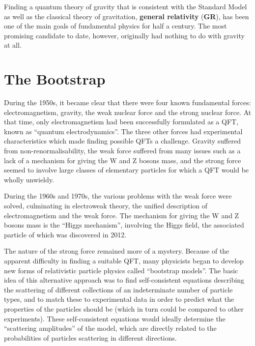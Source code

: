 \documentclass[12pt]{article}
\begin{document}
Finding a quantum theory of gravity that is consistent with the Standard Model as well as the classical theory of gravitation, \textbf{general relativity} (\textbf{GR}), has been one of the main goals of fundamental physics for half a century. The most promising candidate to date, however, originally had nothing to do with gravity at all.

\section{The Bootstrap}

During the 1950s, it became clear that there were four known fundamental forces: electromagnetism, gravity, the weak nuclear force and the strong nuclear force. At that time, only electromagnetism had been successfully formulated as a QFT, known as ``quantum electrodynamics''. The three other forces had experimental characteristics which made finding possible QFTs a challenge. Gravity suffered from non-renormalisability, the weak force suffered from many issues such as a lack of a mechanism for giving the W and Z bosons mass, and the strong force seemed to involve large classes of elementary particles for which a QFT would be wholly unwieldy.
\newline

During the 1960s and 1970s, the various problems with the weak force were solved, culminating in electroweak theory, the unified description of electromagnetism and the weak force. The mechanism for giving the W and Z bosons mass is the ``Higgs mechanism'', involving the Higgs field, the associated particle of which was discovered in 2012.
\newline

The nature of the strong force remained more of a mystery. Because of the apparent difficulty in finding a suitable QFT, many physicists began to develop new forms of relativistic particle physics called ``bootstrap models''. The basic idea of this alternative approach was to find self-consistent equations describing the scattering of different collections of an indeterminate number of particle types, and to match these to experimental data in order to predict what the properties of the particles should be (which in turn could be compared to other experiments). These self-consistent equations would ideally determine the ``scattering amplitudes'' of the model, which are directly related to the probabilities of particles scattering in different directions.
\newline
\end{document}
